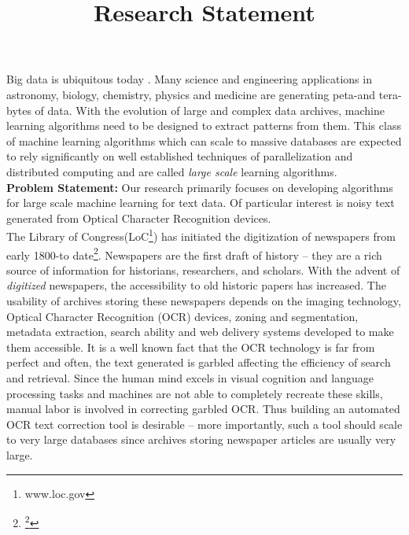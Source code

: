 \documentclass{article}
\title{Research Statement}
\date{}
\begin{document}
\maketitle


\noindent Big data is ubiquitous today \cite{Anand_13}. Many science and engineering applications in astronomy, biology, chemistry, physics and medicine are generating peta-and tera-bytes of data. With the evolution of large and complex data archives, machine learning algorithms need to be designed to extract patterns from them. This class of machine learning algorithms which can scale to massive databases are expected to rely significantly on well established techniques of parallelization and distributed computing and are called \emph{large scale} learning algorithms. \\


\noindent \textbf{Problem Statement: }Our research primarily focuses on developing algorithms for large scale machine learning for text data. Of particular interest is noisy text generated from Optical Character Recognition devices. \\

The Library of Congress(LoC\footnote{www.loc.gov}) has initiated the digitization of newspapers from early 1800-to date\footnote{\footnote{http://chroniclingamerica.loc.gov/}}. Newspapers are the first draft of history -- they are a rich source of information for historians, researchers, and scholars. With the advent of \emph{digitized} newspapers, the accessibility to old historic papers has increased. The usability of archives storing these newspapers depends on the imaging technology, Optical Character Recognition (OCR) devices, zoning and segmentation, metadata extraction, search ability and web delivery systems developed to make them accessible. It is a well known fact that the OCR technology is far from perfect and often, the text generated is garbled affecting the efficiency of search and retrieval. 
Since the human mind excels in visual cognition and language processing tasks and machines are not able to completely recreate these skills, manual labor is involved in correcting garbled OCR. Thus building an automated OCR text correction tool is desirable -- more importantly, such a tool should scale to very large databases since archives storing newspaper articles are usually very large. 
\end{document}
